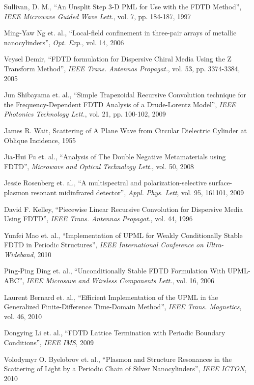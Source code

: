 \begin{thebibliography}{999}
  \bibitem
  {}
  Sullivan, D. M.,
  ``An Unsplit Step 3-D PML for Use with the FDTD Method'',
  \textit{IEEE Microwave Guided Wave Lett.}, vol. 7, pp. 184-187,
  1997

  \bibitem
  {}
  Ming-Yaw Ng et. al.,
  ``Local-field confinement in three-pair arrays of metallic nanocylinders'',
  \textit{Opt. Exp.}, vol. 14,
  2006

  \bibitem
  {}
  Veysel Demir,
  ``FDTD formulation for Dispersive Chiral Media Using the Z Transform Method'',
  \textit{IEEE Trans. Antennas Propagat.}, vol. 53, pp. 3374-3384,
  2005

  \bibitem
  {}  
  Jun Shibayama et. al.,
  ``Simple Trapezoidal Recursive Convolution technique for the Frequency-Dependent FDTD Analysis of a Drude-Lorentz Model'',
  \textit{IEEE Photonics Technology Lett.}, vol. 21, pp. 100-102,
  2009

  \bibitem
  {}
  James R. Wait,
  Scattering of A Plane Wave from Circular Dielectric Cylinder at Oblique Incidence,
  1955

  \bibitem
  {}
  Jia-Hui Fu et. al.,
  ``Analysis of The Double Negative Metamaterials using FDTD'',
  \textit{Microwave and Optical Technology Lett.}, vol. 50,
  2008

  \bibitem
  {}
  Jessie Rosenberg et. al.,
  ``A multispectral and polarization-selective surface-plasmon resonant midinfrared detector'',
  \textit{Appl. Phys. Lett}, vol. 95, 161101,
  2009

  \bibitem
  {}
  David F. Kelley,
  ``Piecewise Linear Recursive Convolution for Dispersive Media Using FDTD'',
  \textit{IEEE Trans. Antennas Propagat.}, vol. 44,
  1996

  \bibitem
  {}
  Yunfei Mao et. al.,
  ``Implementation of UPML for Weakly Conditionally Stable FDTD in Periodic Structures'',
  \textit{IEEE International Conference on Ultra-Wideband},
  2010

  \bibitem
  {}
  Ping-Ping Ding et. al.,
  ``Unconditionally Stable FDTD Formulation With UPML-ABC'',
  \textit{IEEE Microsave and Wireless Components Lett.}, vol. 16,
  2006

  \bibitem
  {}
  Laurent Bernard et. al.,
  ``Efficient Implementation of the UPML in the Generalized Finite-Difference Time-Domain Method'',
  \textit{IEEE Trans. Magnetics}, vol. 46,
  2010

  \bibitem
  {}
  Dongying Li et. al.,
  ``FDTD Lattice Termination with Periodic Boundary Conditions'',
  \textit{IEEE IMS},
  2009

  \bibitem
  {}
  Volodymyr O. Byelobrov et. al.,
  ``Plasmon and Structure Resonances in the Scattering of Light by a Periodic Chain of Silver Nanocylinders'',
  \textit{IEEE ICTON},
  2010


\end{thebibliography}
